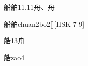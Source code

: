 \begin{Entry}{船舶}{11,11}{⾈、⾈}
  \begin{Phonetics}{船舶}{chuan2bo2}[][HSK 7-9]
  \end{Phonetics}
\end{Entry}

\begin{Entry}{艁}{13}{⾈}
  \begin{Phonetics}{艁}{zao4}
  \end{Phonetics}
\end{Entry}


